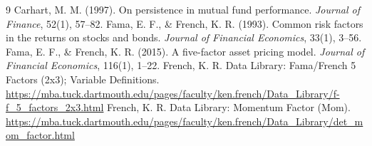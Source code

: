 \documentclass[11pt]{article}
\begin{document}
\begin{thebibliography}{9}\small
{} Carhart, M. M. (1997). On persistence in mutual fund performance. \emph{Journal of Finance}, 52(1), 57--82.
 Fama, E. F., \& French, K. R. (1993). Common risk factors in the returns on stocks and bonds. \emph{Journal of Financial Economics}, 33(1), 3--56.
 Fama, E. F., \& French, K. R. (2015). A five-factor asset pricing model. \emph{Journal of Financial Economics}, 116(1), 1--22.
 French, K. R. Data Library: Fama/French 5 Factors (2x3); Variable Definitions.
\url{https://mba.tuck.dartmouth.edu/pages/faculty/ken.french/Data_Library/f-f_5_factors_2x3.html}
 French, K. R. Data Library: Momentum Factor (Mom).
\url{https://mba.tuck.dartmouth.edu/pages/faculty/ken.french/Data_Library/det_mom_factor.html}
\end{thebibliography}
\end{document}
